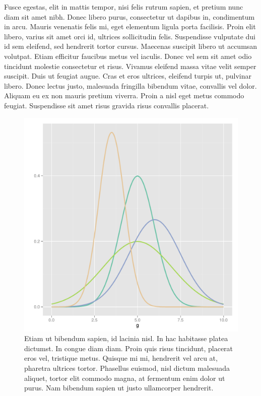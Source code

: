 \documentclass[book,A4paper,10pt,twoside,oldfontcommands]{memoir}\usepackage[]{graphicx}\usepackage[usenames,dvipsnames]{color}
\newenvironment{knitrout}{}{} %
\begin{document}
Fusce egestas, elit in mattis tempor, nisi felis rutrum sapien, et
pretium nunc diam sit amet nibh. Donec libero purus, consectetur ut
dapibus in, condimentum in arcu. Mauris venenatis felis mi, eget
elementum ligula porta facilisis. Proin elit libero, varius sit amet
orci id, ultrices sollicitudin felis. Suspendisse vulputate dui id sem
eleifend, sed hendrerit tortor cursus. Maecenas suscipit libero ut
accumsan volutpat. Etiam efficitur faucibus metus vel iaculis. Donec
vel sem sit amet odio tincidunt molestie consectetur et risus. Vivamus
eleifend massa vitae velit semper suscipit. Duis ut feugiat augue.
Cras et eros ultrices, eleifend turpis ut, pulvinar libero. Donec
lectus justo, malesuada fringilla bibendum vitae, convallis vel dolor.
Aliquam eu ex non mauris pretium viverra. Proin a nisl eget metus
commodo feugiat. Suspendisse sit amet risus gravida risus convallis
placerat.


\begin{knitrout}
\color{fgcolor}\begin{figure}[htb]

{\centering \includegraphics[width=0.45\linewidth]{figuras/distributions} 

}

\caption[Etiam ut bibendum sapien, id lacinia nisl]{Etiam ut bibendum sapien, id lacinia nisl. In hac habitasse platea dictumst. In congue diam diam. Proin quis risus tincidunt, placerat eros vel, tristique metus. Quisque mi mi, hendrerit vel arcu at, pharetra ultrices tortor. Phasellus euismod, nisl dictum malesuada aliquet, tortor elit commodo magna, at fermentum enim dolor ut purus. Nam bibendum sapien ut justo ullamcorper hendrerit.}\label{fig:fig2}
\end{figure}


\end{knitrout}
\end{document}
